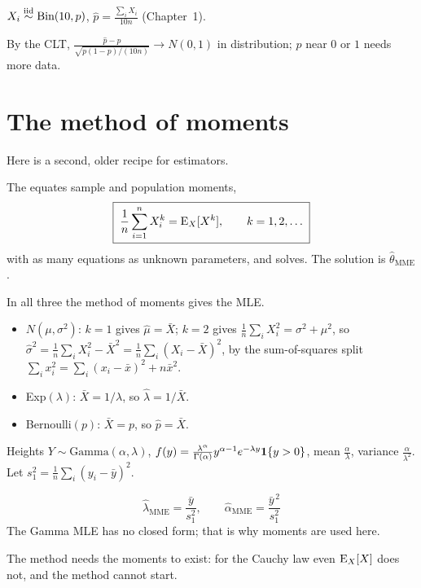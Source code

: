 \begin{example}
$X_i\overset{\text{iid}}{\sim}\text{Bin}(10,p)$, $\hat p=\frac{\sum_iX_i}{10n}$ (Chapter~1).
\begin{deriv}
\end{deriv}
By the CLT, $\frac{\hat p-p}{\sqrt{p(1-p)/(10n)}}\to N(0,1)$ in distribution; $p$ near $0$ or $1$ needs more data.
\end{example}

\section{The method of moments}

Here is a second, older recipe for estimators.

\begin{definition}
The  equates sample and population moments,
\[
  \boxed{\;\frac1n\sum_{i=1}^nX_i^k=\operatorname{E}_X[X^k],\qquad k=1,2,\dots\;}
\]
with as many equations as unknown parameters, and solves. The solution is $\hat\theta_{\text{MME}}$.
\end{definition}

\begin{example}
In all three the method of moments gives the MLE.
\begin{itemize}
  \item $N(\mu,\sigma^2)$: $k=1$ gives $\hat\mu=\bar X$; $k=2$ gives $\frac1n\sum_iX_i^2=\sigma^2+\mu^2$, so $\hat\sigma^2=\frac1n\sum_iX_i^2-\bar X^2=\frac1n\sum_i(X_i-\bar X)^2$, by the sum-of-squares split $\sum_ix_i^2=\sum_i(x_i-\bar x)^2+n\bar x^2$.
  \item Exp$(\lambda)$: $\bar X=1/\lambda$, so $\hat\lambda=1/\bar X$.
  \item Bernoulli$(p)$: $\bar X=p$, so $\hat p=\bar X$.
\end{itemize}
\end{example}

\begin{example}
Heights $Y\sim\text{Gamma}(\alpha,\lambda)$, $f(y)=\frac{\lambda^\alpha}{\Gamma(\alpha)}y^{\alpha-1}e^{-\lambda y}\mathbf{1}\{y>0\}$, mean $\frac\alpha\lambda$, variance $\frac{\alpha}{\lambda^2}$. Let $s_1^2=\frac1n\sum_i(y_i-\bar y)^2$.
\begin{deriv}
\end{deriv}
\[
  \boxed{\;\hat\lambda_{\text{MME}}=\frac{\bar y}{s_1^2},\qquad\hat\alpha_{\text{MME}}=\frac{\bar y^{\,2}}{s_1^2}\;}
\]
The Gamma MLE has no closed form; that is why moments are used here.
\end{example}

The method needs the moments to exist: for the Cauchy law even $\operatorname{E}_X[X]$ does not, and the method cannot start.
